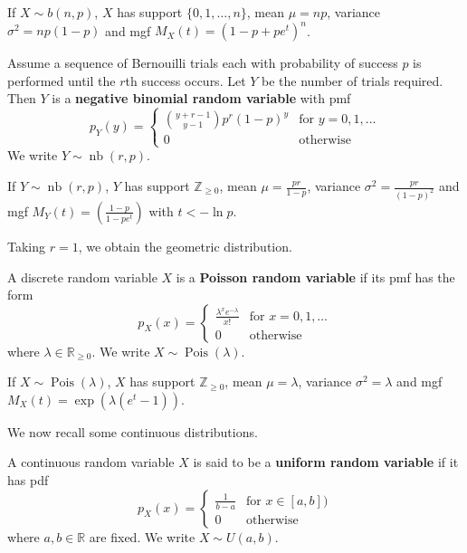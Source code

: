If $X\sim b(n,p)$, $X$ has support $\{0,1,\hdots,n\}$, mean $\mu=np$, variance $\sigma^2=np(1-p)$ and mgf $M_X(t)=(1-p+pe^t)^n$.

\begin{definition}
	Assume a sequence of Bernouilli trials each with probability of success $p$ is performed until the $r$th success occurs. Let $Y$ be the number of trials required. Then $Y$ is a \textbf{negative binomial random variable} with pmf $$p_Y(y)=\begin{cases}
		\binom{y+r-1}{y-1}p^r(1-p)^y & \text{for $y=0,1,\hdots$}\\
		0 & \text{otherwise}
	\end{cases}$$
	We write $Y\sim \mathop{nb}(r,p)$.
\end{definition}

If $Y\sim \mathop{nb}(r,p)$, $Y$ has support $\mathbb Z_{\geq 0}$, mean $\mu=\frac{pr}{1-p}$, variance $\sigma^2=\frac{pr}{(1-p)^2}$ and mgf $M_Y(t)=\left(\frac{1-p}{1-pe^t}\right)$ with $t<-\ln p$.

Taking $r=1$, we obtain the geometric distribution.

\begin{definition}
	A discrete random variable $X$ is a \textbf{Poisson random variable} if its pmf has the form $$p_X(x)=\begin{cases}
		\frac{\lambda^xe^{-\lambda}}{x!} & \text{for $x=0,1,\hdots$}\\
		0 & \text{otherwise}
	\end{cases}$$
	where $\lambda\in\mathbb R_{\geq 0}$. We write $X\sim \operatorname{Pois}(\lambda)$.
\end{definition}

If $X\sim \operatorname{Pois}(\lambda)$, $X$ has support $\mathbb Z_{\geq 0}$, mean $\mu=\lambda$, variance $\sigma^2=\lambda$ and mgf $M_X(t)=\exp(\lambda(e^t-1))$.

We now recall some continuous distributions.

\begin{definition}
	A continuous random variable $X$ is said to be a \textbf{uniform random variable} if it has pdf
	$$p_X(x)=\begin{cases}
		\frac{1}{b-a} & \text{for $x\in[a,b])$}\\
		0 & \text{otherwise}
	\end{cases}$$
	where $a,b\in\mathbb R$ are fixed. We write $X\sim U(a,b)$.
\end{definition}

